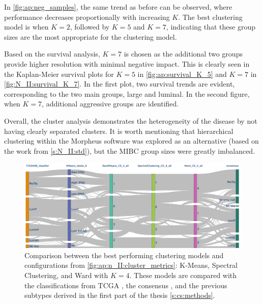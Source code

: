 In \cref{fig:ap:neg_samples}, the same trend as before can be observed, where performance decreases proportionally with increasing $K$. The best clustering model is when $K=2$, followed by $K=5$ and $K=7$, indicating that these group sizes are the most appropriate for the clustering model. 


Based on the survival analysis, $K=7$ is chosen as the additional two groups provide higher resolution with minimal negative impact. This is clearly seen in the Kaplan-Meier survival plots for $K=5$ in \cref{fig:ap:survival_K_5} and $K=7$ in \cref{fig:N_II:survival_K_7}. In the first plot, two survival trends are evident, corresponding to the two main groups, large and luminal. In the second figure, when $K=7$, additional aggressive groups are identified.

Overall, the cluster analysis demonstrates the heterogeneity of the disease by not having clearly separated clusters. It is worth mentioning that hierarchical clustering within the Morpheus software \cite{Broad-InstituteUnknown-kn} was explored as an alternative (based on the work from \cref{s:N_II:std}), but the MIBC group sizes were greatly imbalanced.

\begin{figure}[H]    
    \centering
    \includegraphics[width=1.0\textwidth,height=1.0\textheight,keepaspectratio]{Sections/Network_II/resources/reward/cluster_analysis/cluster_comp.png}
    \caption{Comparison between the best performing clustering models and configurations from \cref{fig:ap:n_II:cluster_metrics}: K-Means, Spectral Clustering, and Ward with $K=4$. These models are compared with the classifications from TCGA \citep{Robertson2017-mg}, the consensus \citep{Kamoun2020-tj}, and the previous subtypes derived in the first part of the thesis \cref{s:cs:methods}.}
    \label{fig:ap:cs_sankey}
\end{figure}

